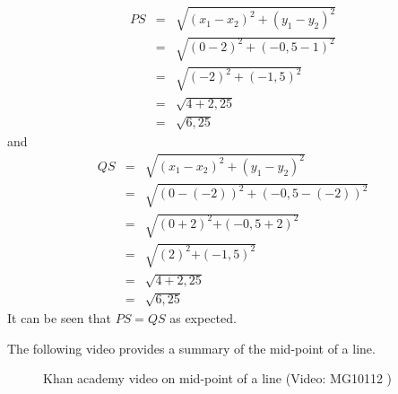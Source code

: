 \begin{eqnarray*}
PS & = & \sqrt{{({x}_{1} - {x}_{2})}^{2} + {({y}_{1} - {y}_{2})}^{2}} \\ 
& = & \sqrt{{(0 - 2)}^{2} + {(-0,5 - 1)}^{2}} \\ 
& = & \sqrt{{(-2)}^{2} + {(-1,5)}^{2}} \\ 
& = & \sqrt{4 + 2,25} \\ 
& = & \sqrt{6,25}
\end{eqnarray*}
and
\begin{eqnarray*}
QS & = & \sqrt{{({x}_{1} - {x}_{2})}^{2} + {({y}_{1} - {y}_{2})}^{2}} \\ 
& = & \sqrt{{(0 - (-2))}^{2} + {(-0,5 - (-2))}^{2}} \\ 
& = & \sqrt{{(0 + 2)}^{2}{+(-0,5 + 2)}^{2}} \\ 
& = & \sqrt{{(2)}^{2}{+(-1,5)}^{2}} \\ 
& = & \sqrt{4 + 2,25} \\ 
& = & \sqrt{6,25}
\end{eqnarray*}
\label{m39119*id69633}It can be seen that $PS=QS$ as expected.\par 
\setcounter{subfigure}{0}
\begin{figure}[H] %
\begin{center}
\end{center}
\end{figure} 
The following video provides a summary of the mid-point of a line.
\setcounter{subfigure}{0}
\begin{figure}[H] %
\textnormal{Khan academy video on mid-point of a line}\vspace{.1in} \nopagebreak
\label{m39119*yt-media2}\label{m39119*yt-video2}
 { (Video:  MG10112 )}
\vspace{2pt}
\vspace{.1in}
\end{figure}      
